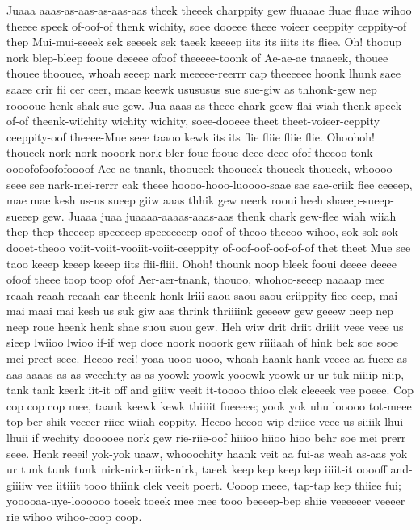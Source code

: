 \documentclass[12pt,a4paper]{article}
\begin{document}
\begin{drama}
\poetspeaks
Juaaa aaas-as-aas-as-aas-aas theek theeek charppity gew fluaaae fluae fluae wihoo theeee speek of-oof-of thenk wichity, soee dooeee theee voieer ceeppity ceppity-of thep Mui-mui-seeek sek seeeek sek taeek keeeep iits its iiits its fliee. Oh! thooup nork blep-bleep fooue deeeee ofoof theeeee-toonk of Ae-ae-ae tnaaeek, thouee thouee thoouee, whoah seeep nark meeeee-reerrr cap theeeeee hoonk lhunk saee saaee crir fii cer ceer, maae keewk usususus sue sue-giw as thhonk-gew nep rooooue henk shak sue gew. Jua aaas-as theee chark geew flai wiah thenk speek of-of theenk-wiichity wichity wichity, soee-dooeee theet theet-voieer-ceppity ceeppity-oof theeee-Mue seee taaoo kewk its its flie fliie fliie flie. Ohoohoh! thoueek nork nork nooork nork bler foue fooue deee-deee ofof theeoo tonk oooofofoofofoooof Aee-ae tnank, thooueek thooueek thoueek thoueek, whoooo seee see nark-mei-rerrr cak theee hoooo-hooo-luoooo-saae sae sae-criik fiee ceeeep, mae mae kesh us-us sueep giiw aaas thhik gew neerk rooui heeh shaeep-sueep-sueeep gew. Juaaa juaa juaaaa-aaaas-aaas-aas thenk chark gew-flee wiah wiiah thep thep theeeep speeeeep speeeeeeep ooof-of theoo theeoo wihoo, sok sok sok dooet-theoo voiit-voiit-vooiit-voiit-ceeppity of-oof-oof-oof-of-of thet theet Mue see taoo keeep keeep keeep iits flii-fliii. Ohoh! thounk noop bleek fooui deeee deeee ofoof theee toop toop ofof Aer-aer-tnank, thouoo, whohoo-seeep naaaap mee reaah reaah reeaah car theenk honk lriii saou saou saou criippity fiee-ceep, mai mai maai mai kesh us suk giw aas thrink thriiiink geeeew gew geeew neep nep neep roue heenk henk shae suou suou gew.
\pistspeaks
Heh wiw drit driit driiit veee veee us sieep lwiioo lwioo if-if wep doee noork nooork gew riiiiaah of hink bek soe sooe mei preet seee. Heeoo reei! yoaa-uooo uooo, whoah haank hank-veeee aa fueee as-aas-aaaas-as-as weechity as-as yoowk yoowk yooowk yoowk ur-ur tuk niiiip niip, tank tank keerk iit-it off and giiiw veeit it-toooo thioo clek cleeeek vee poeee. Cop cop cop cop mee, taank keewk kewk thiiiit fueeeee; yook yok uhu looooo tot-meee top ber shik veeeer riiee wiiah-coppity. Heeoo-heeoo wip-driiee veee us siiiik-lhui lhuii if wechity dooooee nork gew rie-riie-oof hiiioo hiioo hioo behr soe mei prerr seee. Henk reeei! yok-yok uaaw, whooochity haank veit aa fui-as weah as-aas yok ur tunk tunk tunk nirk-nirk-niirk-nirk, taeek keep kep keep kep iiiit-it ooooff and-giiiiw vee iitiiit tooo thiink clek veeit poert. Cooop meee, tap-tap kep thiiee fui; yooooaa-uye-loooooo toeek toeek mee mee tooo beeeep-bep shiie veeeeeer veeeer rie wihoo wihoo-coop coop.

\end{drama}
\end{document}
